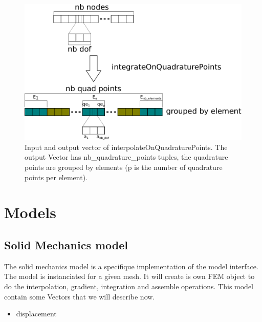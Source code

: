 \documentclass[a4paper,11pt]{book}
\begin{document}
\begin{figure}[!htb]
  \centering
  \includegraphics{figures/interpolate}
  \caption{Input and output  vector of interpolateOnQuadraturePoints. The output
    Vector has nb\_quadrature\_points tuples, the quadrature points are grouped by
    elements (p is the number of quadrature points per element).}
  \label{fig:interpolate-storage}
\end{figure}

\chapter{Models}

\section{Solid Mechanics model}

The  solid  mechanics  model  is   a  specifique  implementation  of  the  model
interface. The model is instanciated for a given mesh. It will create is own FEM
object   to   do  the   interpolation,   gradient,   integration  and   assemble
operations. This model contain some Vectors that we will describe now.

\begin{itemize}
\item displacement
\end{itemize}
\end{document}
